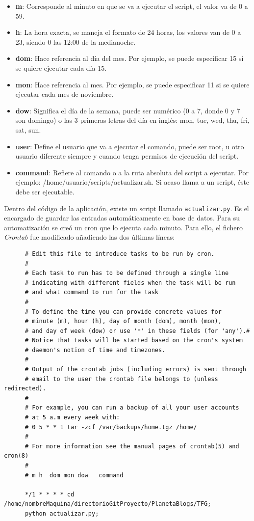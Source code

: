 \documentclass[a4paper, 12pt]{book}
\begin{document}
\begin{itemize}
  \item {\bfseries m}: Corresponde al minuto en que se va a ejecutar el script, el valor va de 0 a 59.
  \item {\bfseries h}: La hora exacta, se maneja el formato de 24 horas, los valores van de 0 a 23, siendo 0 las 12:00 de la medianoche.
  \item {\bfseries dom}: Hace referencia al d\'ia del mes. Por ejemplo, se puede especificar 15 si se quiere ejecutar cada d\'ia 15.
  \item {\bfseries mon}: Hace referencia al mes. Por ejemplo, se puede especificar 11 si se quiere ejecutar cada mes de noviembre.
  \item {\bfseries dow}: Significa el d\'ia de la semana, puede ser num\'erico (0 a 7, donde 0 y 7 son domingo) o las 3 primeras letras del d\'ia en 
  ingl\'es: mon, tue, wed, thu, fri, sat, sun.
  \item {\bfseries user}: Define el usuario que va a ejecutar el comando, puede ser root, u otro usuario diferente siempre y cuando tenga permisos de 
  ejecuci\'on del script.
  \item {\bfseries command}: Refiere al comando o a la ruta absoluta del script a ejecutar. Por ejemplo: /home/usuario/scripts/actualizar.sh. Si acaso 
  llama a un script, \'este debe ser ejecutable.
\end{itemize}
Dentro del c\'odigo de la aplicaci\'on, existe un script llamado \texttt{actualizar.py}. Es el encargado de guardar las entradas autom\'aticamente en base
de datos. Para su automatizaci\'on se cre\'o un cron que lo ejecuta cada minuto. Para ello, el fichero \textit{Crontab} fue modificado a\~nadiendo las dos \'ultimas 
l\'ineas: 
{\footnotesize\begin{verbatim} 
      # Edit this file to introduce tasks to be run by cron.
      # 
      # Each task to run has to be defined through a single line
      # indicating with different fields when the task will be run
      # and what command to run for the task
      # 
      # To define the time you can provide concrete values for
      # minute (m), hour (h), day of month (dom), month (mon),
      # and day of week (dow) or use '*' in these fields (for 'any').# 
      # Notice that tasks will be started based on the cron's system
      # daemon's notion of time and timezones.
      # 
      # Output of the crontab jobs (including errors) is sent through
      # email to the user the crontab file belongs to (unless redirected).
      # 
      # For example, you can run a backup of all your user accounts
      # at 5 a.m every week with:
      # 0 5 * * 1 tar -zcf /var/backups/home.tgz /home/
      # 
      # For more information see the manual pages of crontab(5) and cron(8)
      # 
      # m h  dom mon dow   command
      
      */1 * * * * cd /home/nombreMaquina/directorioGitProyecto/PlanetaBlogs/TFG;
      python actualizar.py; 
\end{verbatim}}
\end{document}
